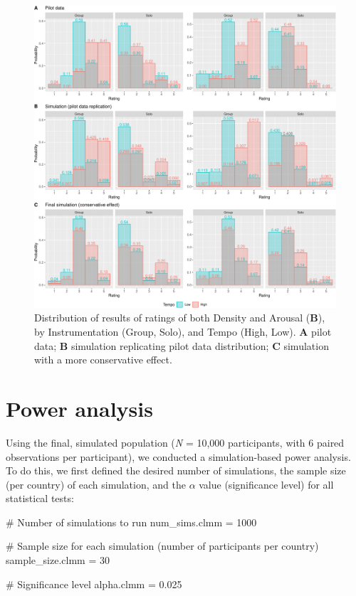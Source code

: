 \documentclass[
  bookmarksnumbered]{article}
\newenvironment{Shaded}{\begin{snugshade}}{\end{snugshade}}
\newcommand{\CommentTok}[1]{\textcolor[rgb]{0.50,0.62,0.50}{#1}}
\newcommand{\DecValTok}[1]{\textcolor[rgb]{0.86,0.86,0.80}{#1}}
\newcommand{\FloatTok}[1]{\textcolor[rgb]{0.75,0.75,0.82}{#1}}
\newcommand{\NormalTok}[1]{\textcolor[rgb]{0.80,0.80,0.80}{#1}}
\newcommand{\OtherTok}[1]{\textcolor[rgb]{0.94,0.94,0.56}{#1}}
\begin{document}
\begin{figure}
\centering
\includegraphics{Power_analysis_files/figure-latex/unnamed-chunk-12-1.pdf}
\caption{\label{fig:unnamed-chunk-12}Distribution of results of ratings of both Density and Arousal (\textbf{B}), by Instrumentation (Group, Solo), and Tempo (High, Low). \textbf{A} pilot data; \textbf{B} simulation replicating pilot data distribution; \textbf{C} simulation with a more conservative effect.}
\end{figure}

\hypertarget{power-section}{%
\section{Power analysis}\label{power-section}}

Using the final, simulated population (\emph{N} = 10,000 participants, with 6 paired observations per participant), we conducted a simulation-based power analysis. To do this, we first defined the desired number of simulations, the sample size (per country) of each simulation, and the \(\alpha\) value (significance level) for all statistical tests:

\begin{Shaded}
\begin{Highlighting}[]
\CommentTok{\# Number of simulations to run}
\NormalTok{num\_sims.clmm }\OtherTok{=} \DecValTok{1000} 

\CommentTok{\# Sample size for each simulation (number of participants per country)}
\NormalTok{sample\_size.clmm }\OtherTok{=} \DecValTok{30} 

\CommentTok{\# Significance level}
\NormalTok{alpha.clmm }\OtherTok{=} \FloatTok{0.025}
\end{Highlighting}
\end{Shaded}
\end{document}
